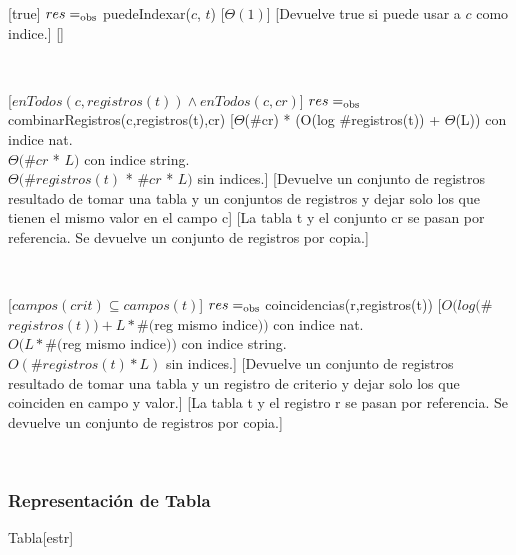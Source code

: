 \begin{Interfaz}
[true]
{$res =_{\mathrm{obs}}$ puedeIndexar($c$, $t$)}
[$\Theta(1)$]
[Devuelve true si puede usar a $c$ como indice.]
[]

~

[$enTodos(c,registros(t)) \land enTodos(c,cr)$]
{$res =_{\mathrm{obs}}$ combinarRegistros(c,registros(t),cr)}
[$\Theta$($\#$cr) * (O(log $\#$registros(t)) + $\Theta$(L)) con indice nat. \\
$\Theta(\#cr$ * $L)$	con indice string. \\
$\Theta(\#registros(t)$ * $\#cr$ * $L)$ sin indices.]
[Devuelve un conjunto de registros resultado de tomar una tabla y un conjuntos de registros y dejar solo los que tienen el mismo valor en el campo c]
[La tabla t y el conjunto cr se pasan por referencia. Se devuelve un conjunto de registros por copia.]

~

[$campos(crit) \subseteq campos(t)$]
{$res =_{\mathrm{obs}}$ coincidencias(r,registros(t))}
[$O(log ($\#$registros(t)) + L * \#($reg mismo indice$))$ con indice nat. \\
$O(L * \#($reg mismo indice$))$	con indice string. \\
$O(\#registros(t) * L)$	sin indices.]
[Devuelve un conjunto de registros resultado de tomar una tabla y un registro de criterio y dejar solo los que coinciden en campo y valor.]
[La tabla t y el registro r se pasan por referencia. Se devuelve un conjunto de registros por copia.]

\end{Interfaz}

~

\pagebreak
\subsubsection{Representaci\'on de Tabla}

\begin{Estructura}{Tabla}[estr]

	\begin{Tupla}[estr]
	\end{Tupla}

\end{Estructura}

